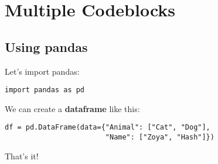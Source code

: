 \documentclass[10pt]{report}
\begin{document}
\chapter{Multiple Codeblocks}

\section{Using pandas}


Let's import pandas:


\begin{verbatim}
import pandas as pd
\end{verbatim}
            

We can create a \textbf{dataframe} like this:


\begin{verbatim}
df = pd.DataFrame(data={"Animal": ["Cat", "Dog"],
                        "Name": ["Zoya", "Hash"]})
\end{verbatim}
            
That's it!
\end{document}
